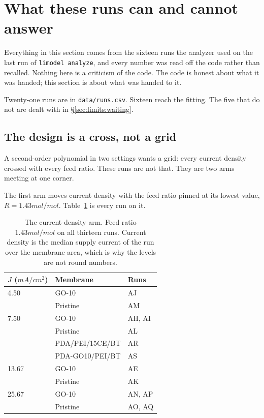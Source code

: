 \section{What these runs can and cannot answer}
\label{sec:limits}

Everything in this section comes from the sixteen runs the analyzer used on the last
run of \texttt{limodel analyze}, and every number was read off the code rather than
recalled. Nothing here is a criticism of the code. The code is honest about what it
was handed; this section is about what was handed to it.

Twenty-one runs are in \texttt{data/runs.csv}. Sixteen reach the fitting. The five that
do not are dealt with in \S\ref{sec:limits:waiting}.

\subsection{The design is a cross, not a grid}
\label{sec:limits:cross}

A second-order polynomial in two settings wants a grid: every current density crossed
with every feed ratio. These runs are not that. They are two arms meeting at one corner.

The first arm moves current density with the feed ratio pinned at its lowest value,
$R = 1.43\unit{mol/mol}$. Table~\ref{tab:limits:current-arm} is every run on it.

\begin{table}[htbp]
  \centering
  \caption{The current-density arm. Feed ratio $1.43\unit{mol/mol}$ on all thirteen runs.
    Current density is the median supply current of the run over the membrane area, which
    is why the levels are not round numbers.}
  \label{tab:limits:current-arm}
  \begin{tabular}{l l l}
    \toprule
    $J$ ($\unit{mA/cm^2}$) & Membrane & Runs \\
    \midrule
    4.50  & GO-10            & AJ \\
          & Pristine         & AM \\
    7.50  & GO-10            & AH, AI \\
          & Pristine         & AL \\
          & PDA/PEI/15CE/BT  & AR \\
          & PDA-GO10/PEI/BT  & AS \\
    13.67 & GO-10            & AE \\
          & Pristine         & AK \\
    25.67 & GO-10            & AN, AP \\
          & Pristine         & AO, AQ \\
    \bottomrule
  \end{tabular}
\end{table}

